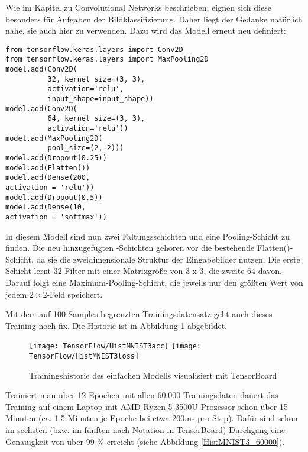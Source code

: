 Wie im Kapitel zu Convolutional Networks beschrieben, eignen sich diese besonders für Aufgaben der Bildklassifizierung.
Daher liegt der Gedanke natürlich nahe, sie auch hier zu verwenden. Dazu wird das Modell erneut neu definiert:

	
\begin{verbatim}
from tensorflow.keras.layers import Conv2D
from tensorflow.keras.layers import MaxPooling2D
model.add(Conv2D(
          32, kernel_size=(3, 3),
          activation='relu',
          input_shape=input_shape))
model.add(Conv2D(
          64, kernel_size=(3, 3),
          activation='relu'))
model.add(MaxPooling2D(
          pool_size=(2, 2)))
model.add(Dropout(0.25))
model.add(Flatten())
model.add(Dense(200,
activation = 'relu'))
model.add(Dropout(0.5))
model.add(Dense(10,
activation = 'softmax'))
\end{verbatim}




\medskip

In diesem Modell sind nun zwei Faltungsschichten und eine Pooling-Schicht zu finden.
Die neu hinzugefügten -Schichten gehören vor die bestehende Flatten()-Schicht, 
da sie die zweidimensionale Struktur der Eingabebilder nutzen. Die erste
Schicht lernt 32 Filter mit einer Matrixgröße von 3
x 3, die zweite 64 davon. Darauf folgt eine Maximum-Pooling-Schicht, die jeweils nur den größten Wert
von jedem $2 \times 2$-Feld speichert.

Mit dem auf 100 Samples begrenzten Trainingsdatensatz geht auch dieses Training noch fix. 
Die Historie ist in Abbildung \ref{HistMNIST3} abgebildet.

\begin{figure}[H]
	\begin{center}
		\texttt{[image: TensorFlow/HistMNIST3acc]}
		\texttt{[image: TensorFlow/HistMNIST3loss]}
		\caption{Trainingshistorie des einfachen Modells visualisiert mit TensorBoard} 
		\label{HistMNIST3}
	\end{center}
\end{figure}

Trainiert man über 12 Epochen mit allen 60.000 Trainingsdaten dauert das Training auf einem Laptop mit AMD Ryzen 5 3500U Prozessor
schon über 15 Minuten (ca. 1,5 Minuten je Epoche bei etwa 200ms pro Step). Dafür sind schon im sechsten (bzw. im fünften nach Notation in TensorBoard) 
Durchgang eine Genauigkeit von über 99 \% erreicht 
(siehe Abbildung \ref{HistMNIST3_60000}).

